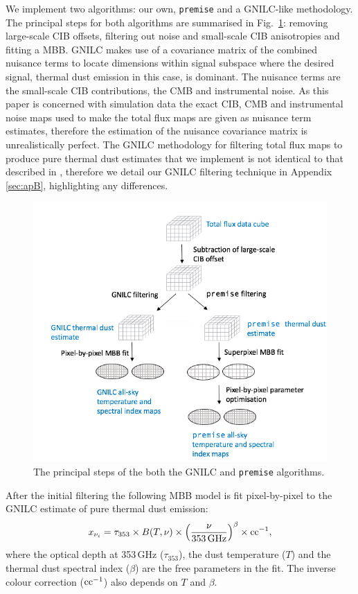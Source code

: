 \documentclass[a4paper,fleqn,usenatbib]{mnras}
\begin{document}
We implement two algorithms: our own, {\texttt{premise}} and a GNILC-like methodology. The principal steps for both algorithms are summarised in Fig.~\ref{fig:methFlo}: removing large-scale CIB offsets, filtering out noise and small-scale CIB anisotropies and fitting a MBB. GNILC makes use of a covariance matrix of the combined nuisance terms to locate dimensions within signal subspace where the desired signal, thermal dust emission in this case, is dominant. The nuisance terms are the small-scale CIB contributions, the CMB and instrumental noise. As this paper is concerned with simulation data the exact CIB, CMB and instrumental noise maps used to make the total flux maps are given as nuisance term estimates, therefore the estimation of the nuisance covariance matrix is unrealistically perfect. The GNILC methodology for filtering total flux maps to produce pure thermal dust estimates that we implement is not identical to that described in \citet{gnilc}, therefore we detail our GNILC filtering technique in Appendix \ref{sec:apB}, highlighting any differences. 

\begin{figure}
\centering
\includegraphics[width=0.99\linewidth]{methodDiagram}
\caption{The principal steps of the both the GNILC and {\texttt{premise}} algorithms.}
\label{fig:methFlo}
\end{figure}

After the initial filtering the following MBB model is fit pixel-by-pixel to the GNILC estimate of pure thermal dust emission: 
\begin{eqnarray}
x_{\nu_{i}} = \tau_{353} \times B(T,  \nu) \times \left(\frac{\nu}{353 \, \rm{GHz}}\right)^{\beta} \times \rm{cc}^{-1},
\end{eqnarray}
where the optical depth at 353\,GHz ($\tau_{353}$), the dust temperature ($T$) and the thermal dust spectral index ($\beta$) are the free parameters in the fit. The inverse colour correction ($\rm{cc}^{-1}$) also depends on $T$ and $\beta$.
\end{document}
